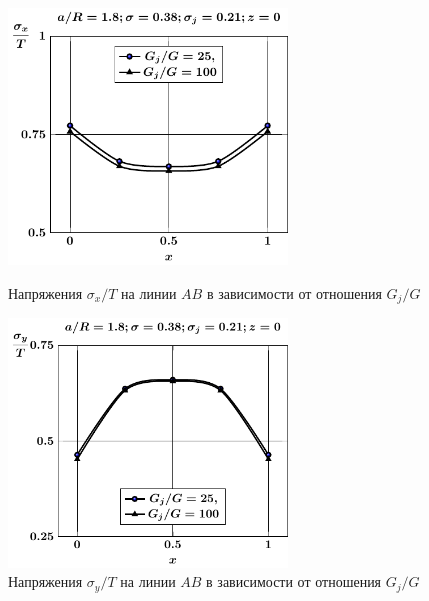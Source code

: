 \begin{russian}
\begin{figure}[h!]
\centering\footnotesize
\parbox[b]{7.5cm}{\centering\includegraphics[width=7.4cm]{inc5-g-a18-sig_x.pdf}
\caption{Напряжения $\sigma_x/T$ на линии $AB$ в зависимости от отношения $G_j/G$
\label{f:7:142}}}\hfil\hfil
\parbox[b]{7.5cm}{\centering\includegraphics[width=7.4cm]{inc5-g-a18-sig_y.pdf}
\caption{Напряжения $\sigma_y/T$ на линии $AB$ в зависимости от отношения $G_j/G$
\label{f:7:143}}}
\end{figure}


\end{russian}
